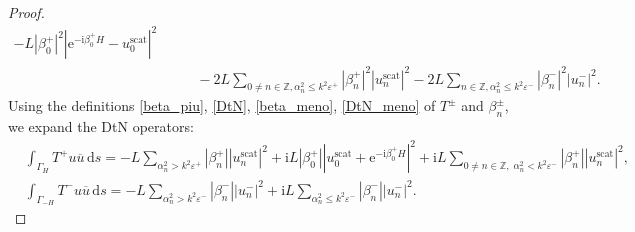 \documentclass[10pt,a4paper]{amsart}
\newcommand{\IZ}{{\mathbb Z}}
\newcommand{\ri}{{\mathrm i}}
\newcommand{\re}{{\mathrm e}}
\newcommand{\rd}{{\,\mathrm d}}
\newcommand{\scat}{{\mathrm{scat}}}
\newcommand{\cu}{{\overline{u}}}
\newcommand{\GH}{{\Gamma_H}}
\newcommand{\GmH}{{\Gamma_{-H}}}
\begin{document}
\begin{proof}
\begin{align*}
	-L|\beta_0^+|^2|\re^{-\ri \beta_0^+H}-u_0^\scat|^2\\
	&\qquad-2L \sum_{0\neq n \in \IZ, \alpha_n^2 \leq k^2\varepsilon^+} |\beta_n^+|^2 {|u_n^\scat|^2}
	- 2L \sum_{n \in \IZ, \alpha_n^2 \leq k^2\varepsilon^-} |\beta_n^-|^2|u^-_n|^2.
\end{align*}
Using the definitions \eqref{beta_piu}, \eqref{DtN}, \eqref{beta_meno}, \eqref{DtN_meno} of $T^\pm$ and $\beta_n^\pm$, we expand the DtN operators:
\begin{align*}
	&\int_{\GH} T^+ u\cu\rd s
	=-L\sum_{\alpha^2_n > k^2\varepsilon^+} |\beta_n^+||u_n^\scat|^2
	+\ri L |\beta_0^+||u_0^\scat+\re^{-\ri \beta_0^+H}|^2
	+\ri L\!\!\sum_{0\ne n\in\IZ,\;\alpha^2_n < k^2\varepsilon^-}\!\!\! |\beta_n^+||u_n^\scat|^2 ,
	\\
	&\int_\GmH T^- u\cu\rd s
	=-L\sum_{\alpha^2_n > k^2\varepsilon^-} |\beta_n^-||u_n^-|^2
	+\ri L\sum_{\alpha^2_n \leq k^2\varepsilon^-} |\beta_n^-||u_n^-|^2 .
\end{align*}


\end{proof}
\end{document}
